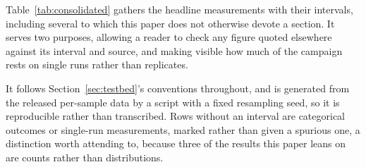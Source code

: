 \documentclass[preprint,12pt]{elsarticle}
\begin{document}
Table~\ref{tab:consolidated} gathers the headline measurements with their
intervals, including several to which this paper does not otherwise devote a
section. It serves two purposes, allowing a reader to check any figure quoted
elsewhere against its interval and source, and making visible how much of the
campaign rests on single runs rather than replicates.

It follows Section~\ref{sec:testbed}'s conventions throughout, and is generated
from the released per-sample data by a script with a fixed resampling seed, so
it is reproducible rather than transcribed. Rows without an interval are
categorical outcomes or single-run measurements, marked rather than given
a spurious one, a distinction worth attending to, because three of the results
this paper leans on are counts rather than distributions.
\end{document}
